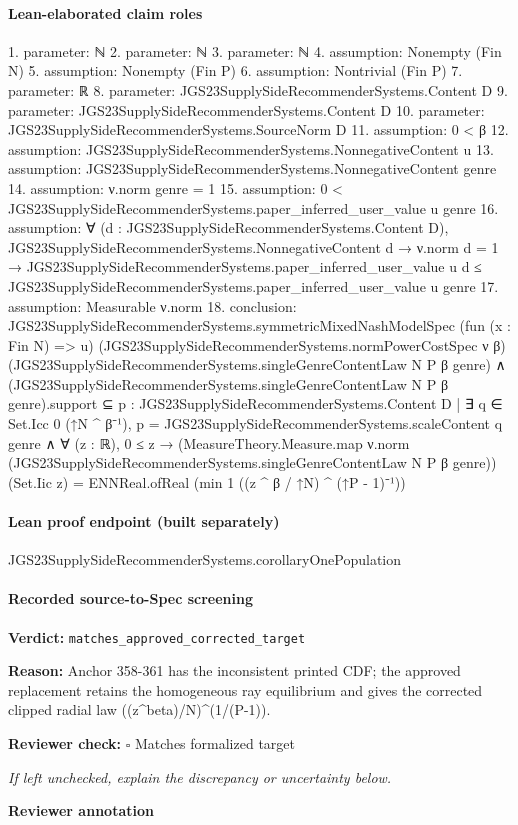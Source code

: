 \documentclass[10pt]{article}
\newcommand{\reviewerbox}{%
  \par\noindent\fbox{\parbox{0.96\linewidth}{\rule{0pt}{0.38in}}}\par
}
\newcommand{\reviewmatch}[1]{%
  \par\noindent\textbf{Reviewer check:} $\square$\; #1\par
  \noindent\emph{If left unchecked, explain the discrepancy or uncertainty below.}\par
}
\begin{document}
\paragraph{Lean-elaborated claim roles}\begin{ReviewVerbatim}
1. parameter: ℕ
2. parameter: ℕ
3. parameter: ℕ
4. assumption: Nonempty (Fin N)
5. assumption: Nonempty (Fin P)
6. assumption: Nontrivial (Fin P)
7. parameter: ℝ
8. parameter: JGS23SupplySideRecommenderSystems.Content D
9. parameter: JGS23SupplySideRecommenderSystems.Content D
10. parameter: JGS23SupplySideRecommenderSystems.SourceNorm D
11. assumption: 0 < β
12. assumption: JGS23SupplySideRecommenderSystems.NonnegativeContent u
13. assumption: JGS23SupplySideRecommenderSystems.NonnegativeContent genre
14. assumption: ν.norm genre = 1
15. assumption: 0 < JGS23SupplySideRecommenderSystems.paper_inferred_user_value u genre
16. assumption: ∀ (d : JGS23SupplySideRecommenderSystems.Content D),
  JGS23SupplySideRecommenderSystems.NonnegativeContent d →
    ν.norm d = 1 →
      JGS23SupplySideRecommenderSystems.paper_inferred_user_value u d ≤
        JGS23SupplySideRecommenderSystems.paper_inferred_user_value u genre
17. assumption: Measurable ν.norm
18. conclusion: JGS23SupplySideRecommenderSystems.symmetricMixedNashModelSpec (fun (x : Fin N) => u)
    (JGS23SupplySideRecommenderSystems.normPowerCostSpec ν β)
    (JGS23SupplySideRecommenderSystems.singleGenreContentLaw N P β genre) ∧
  (JGS23SupplySideRecommenderSystems.singleGenreContentLaw N P β genre).support ⊆
      {p : JGS23SupplySideRecommenderSystems.Content D |
        ∃ q ∈ Set.Icc 0 (↑N ^ β⁻¹), p = JGS23SupplySideRecommenderSystems.scaleContent q genre} ∧
    ∀ (z : ℝ),
      0 ≤ z →
        (MeasureTheory.Measure.map ν.norm (JGS23SupplySideRecommenderSystems.singleGenreContentLaw N P β genre))
            (Set.Iic z) =
          ENNReal.ofReal (min 1 ((z ^ β / ↑N) ^ (↑P - 1)⁻¹))
\end{ReviewVerbatim}

\paragraph{Lean proof endpoint (built separately)}\begin{ReviewVerbatim}
JGS23SupplySideRecommenderSystems.corollaryOnePopulation
\end{ReviewVerbatim}

\paragraph{Recorded source-to-Spec screening}
\textbf{Verdict:} \texttt{matches\_approved\_corrected\_target}
\\
{\raggedright
\textbf{Reason:} Anchor 358-\allowbreak{}361 has the inconsistent printed CDF;\allowbreak{} the approved replacement retains the homogeneous ray equilibrium and gives the corrected clipped radial law ((z\textasciicircum{}beta)/\allowbreak{}N)\textasciicircum{}(1/\allowbreak{}(P-\allowbreak{}1)).\allowbreak{}
\par}
\reviewmatch{Matches formalized target}
\noindent\textbf{Reviewer annotation}\par
\reviewerbox
\clearpage
\hypertarget{source-claim-a8e4bb64ace372cc}{}
\end{document}
